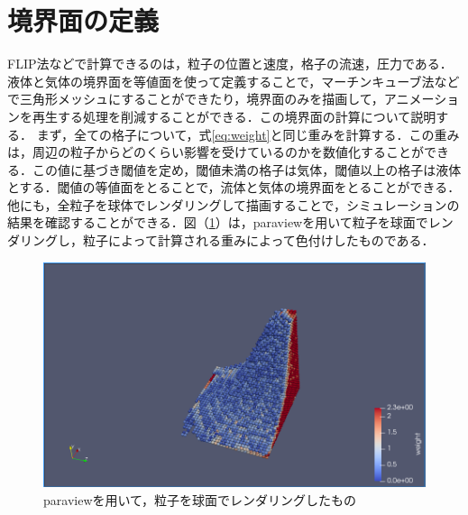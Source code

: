\documentclass[a4j,12pt]{jreport}
\begin{document}
\section{境界面の定義} \label{sec:boundaly_def}
FLIP法などで計算できるのは，粒子の位置と速度，格子の流速，圧力である．液体と気体の境界面を等値面を使って定義することで，マーチンキューブ法などで三角形メッシュにすることができたり，境界面のみを描画して，アニメーションを再生する処理を削減することができる．この境界面の計算について説明する．
まず，全ての格子について，式\ref{eq:weight}と同じ重みを計算する．この重みは，周辺の粒子からどのくらい影響を受けているのかを数値化することができる．この値に基づき閾値を定め，閾値未満の格子は気体，閾値以上の格子は液体とする．閾値の等値面をとることで，流体と気体の境界面をとることができる．他にも，全粒子を球体でレンダリングして描画することで，シミュレーションの結果を確認することができる．図（\ref{fig:paraview}）は，paraviewを用いて粒子を球面でレンダリングし，粒子によって計算される重みによって色付けしたものである．
\begin{figure}[htbp]
\begin{center}
\includegraphics[width=160mm]{paraview.png}
\end{center}
\caption{paraviewを用いて，粒子を球面でレンダリングしたもの}
\label{fig:paraview}
\end{figure}
\end{document}
